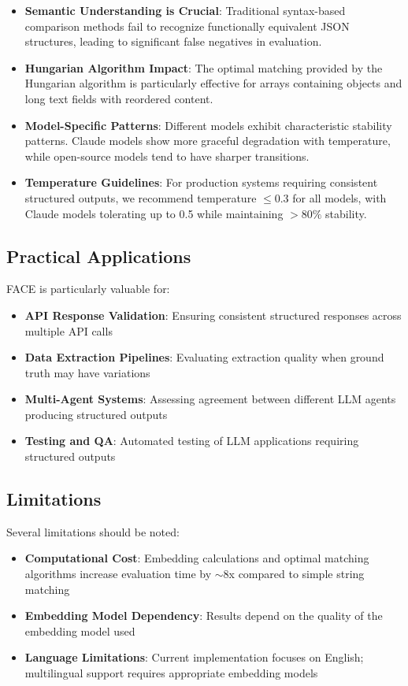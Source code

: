 \documentclass[letterpaper]{article} %
\begin{document}
\begin{itemize}
\item \textbf{Semantic Understanding is Crucial}: Traditional syntax-based comparison methods fail to recognize functionally equivalent JSON structures, leading to significant false negatives in evaluation.
\item \textbf{Hungarian Algorithm Impact}: The optimal matching provided by the Hungarian algorithm is particularly effective for arrays containing objects and long text fields with reordered content.
\item \textbf{Model-Specific Patterns}: Different models exhibit characteristic stability patterns. Claude models show more graceful degradation with temperature, while open-source models tend to have sharper transitions.
\item \textbf{Temperature Guidelines}: For production systems requiring consistent structured outputs, we recommend temperature $\leq 0.3$ for all models, with Claude models tolerating up to 0.5 while maintaining $>80\%$ stability.
\end{itemize}

\subsection{Practical Applications}

FACE is particularly valuable for:
\begin{itemize}
\item \textbf{API Response Validation}: Ensuring consistent structured responses across multiple API calls
\item \textbf{Data Extraction Pipelines}: Evaluating extraction quality when ground truth may have variations
\item \textbf{Multi-Agent Systems}: Assessing agreement between different LLM agents producing structured outputs
\item \textbf{Testing and QA}: Automated testing of LLM applications requiring structured outputs
\end{itemize}

\subsection{Limitations}

Several limitations should be noted:
\begin{itemize}
\item \textbf{Computational Cost}: Embedding calculations and optimal matching algorithms increase evaluation time by $\sim$8x compared to simple string matching
\item \textbf{Embedding Model Dependency}: Results depend on the quality of the embedding model used
\item \textbf{Language Limitations}: Current implementation focuses on English; multilingual support requires appropriate embedding models
\end{itemize}
\end{document}

